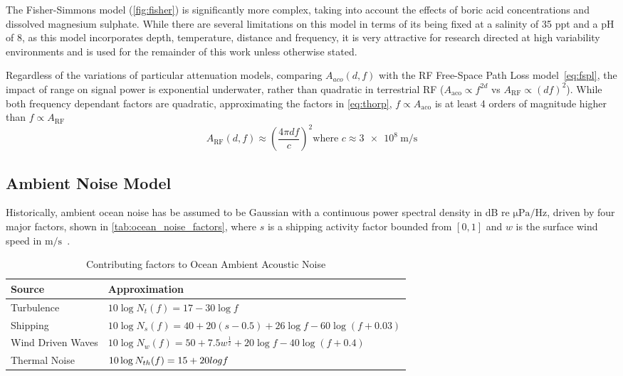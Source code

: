 %
The Fisher-Simmons model (\autoref{fig:fisher}) is significantly more complex, taking into account the effects of boric acid concentrations and dissolved magnesium sulphate. While there are several limitations on this model in terms of its being fixed at a salinity of 35 ppt and a pH of 8, as this model incorporates depth, temperature, distance and frequency, it is very attractive for research directed at high variability environments and is used for the remainder of this work unless otherwise stated.




Regardless of the variations of particular attenuation models, comparing $A_{aco}(d,f)$ with the RF Free-Space Path Loss model~\autoref{eq:fspl}, the impact of range on signal power is exponential underwater, rather than quadratic in terrestrial RF ($A_{\text{aco}} \propto f^{2d}$ vs $A_{\text{RF}} \propto (df)^2$). 
While both frequency dependant factors are quadratic, approximating the factors in \autoref{eq:thorp}, $f\propto A_{\text{aco}}$ is at least 4 orders of magnitude higher than $f\propto A_{\text{RF}}$
\begin{equation}
  \label{eq:fspl}
  A_{\text{RF}}(d,f) \approx \left( \frac{4\pi d f}{c} \right)^2
  \text{where }c\approx \SI{3e8}{\meter\per\second}
\end{equation}


 \subsection{Ambient Noise Model}

 Historically, ambient ocean noise has be assumed to be Gaussian with a continuous power spectral density in dB re $\si{\micro\pascal\per\hertz}$, driven by four major factors, shown in \autoref{tab:ocean_noise_factors}, where $s$ is a shipping activity factor bounded from $[0,1]$ and $w$ is the surface wind speed in $\si{\meter\per\second}$~\cite{coates1989}.

\begin{table}[h]\centering
  \caption{Contributing factors to Ocean Ambient Acoustic Noise}
  \label{tab:ocean_noise_factors}
  \begin{tabularx}{\textwidth}{p{3.5cm} X}\toprule
    Source & Approximation \\ \midrule
    Turbulence & $10 \log N_t(f)=17-30\log f$\\
    Shipping & $10 \log N_s(f) = 40+20(s-0.5)+26\log f-60\log(f+0.03)$\\
    Wind Driven Waves & $10\log N_w(f) = 50+7.5w^{\frac{1}{2}}+20\log f - 40\log(f+0.4)$\\ 
    Thermal Noise & $10\log N_{th}(f) = \-15 + 20 log f$\\\bottomrule
  \end{tabularx}
\end{table}

